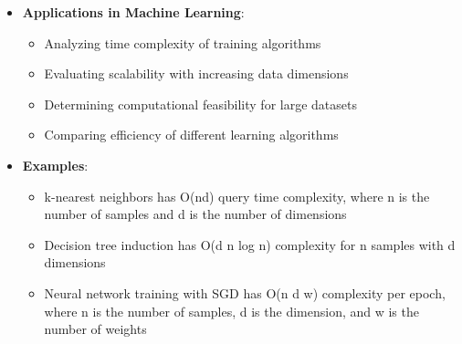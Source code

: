 \documentclass{article}
\begin{document}
\begin{itemize}
    \item \textbf{Applications in Machine Learning}:
    \begin{itemize}
        \item Analyzing time complexity of training algorithms
        \item Evaluating scalability with increasing data dimensions
        \item Determining computational feasibility for large datasets
        \item Comparing efficiency of different learning algorithms
    \end{itemize}
    
    \item \textbf{Examples}:
    \begin{itemize}
        \item k-nearest neighbors has O(nd) query time complexity, where n is the number of samples and d is the number of dimensions
        \item Decision tree induction has O(d n log n) complexity for n samples with d dimensions
        \item Neural network training with SGD has O(n d w) complexity per epoch, where n is the number of samples, d is the dimension, and w is the number of weights
    \end{itemize}
\end{itemize}
\end{document}
